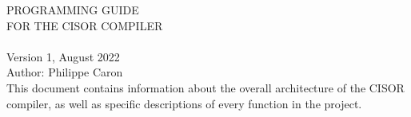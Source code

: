 \documentclass{article}
\begin{document}

\begin{center}
  \vspace*{0.5in}
  {\Huge PROGRAMMING GUIDE}\\
  \vspace{1em}
  {\Large FOR THE CISOR COMPILER}\\
  \vspace{10em}
  \\
  \vspace{10em}
  {\Large Version 1, August 2022}\\
  \vspace{1em}
  {\large Author: Philippe Caron}\\
  \vspace{2em}
  This document contains information about the overall architecture of the CISOR compiler, as well as specific descriptions of every function in the project.
\end{center}
\pagebreak


\tableofcontents

\pagebreak
\end{document}
